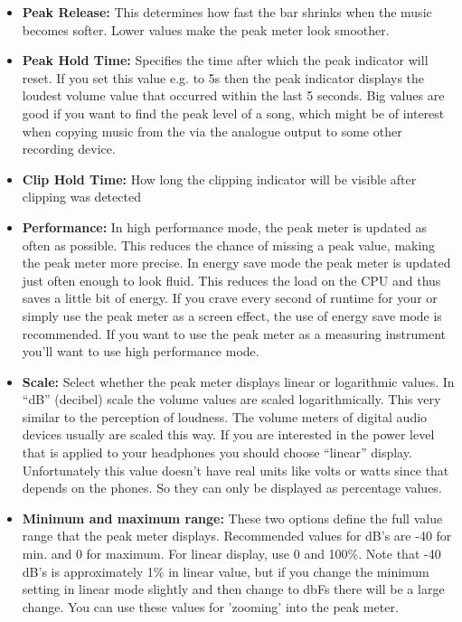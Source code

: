 \begin{itemize}
\begin{itemize}
{    \begin{itemize}
    \item \textbf{Peak Release:}
      This determines how fast the bar shrinks when the music becomes softer. Lower values make the peak meter look smoother.
    \item \textbf{Peak Hold Time:} 
      Specifies the time after which the peak indicator will reset. If you set this value e.g. to 5s then the peak indicator displays the loudest volume value that occurred within the last 5 seconds. Big values are good if you want to find the peak level of a song, which might be of interest when copying music from the \dap via the analogue output to some other recording device.
    \item \textbf{Clip Hold Time:}
      How long the clipping indicator will be visible after clipping was detected 
    \item \textbf{Performance:}
      In high performance mode, the peak meter is updated as often as possible. This reduces the chance of missing a peak value, making the peak meter more precise. In energy save mode the peak meter is updated just often enough to look fluid. This reduces the load on the CPU and thus saves a little bit of energy. If you crave every second of runtime for your \dap or simply use the peak meter as a screen effect, the use of energy save mode is recommended. If you want to use the peak meter as a measuring instrument you'll want to use high performance mode.
    \item \textbf{Scale:}
      Select whether the peak meter displays linear or logarithmic values. In ``dB'' (decibel) scale the volume values are scaled logarithmically. This very similar to the perception of loudness. The volume meters of digital audio devices usually are scaled this way. If you are interested in the power level that is applied to your headphones you should choose ``linear'' display. Unfortunately this value doesn't have real units like volts or watts since that depends on the phones. So they can only be displayed as percentage values.
    \item \textbf{Minimum and maximum range:} 
      These two options define the full value range that the peak meter displays. Recommended values for dB's are {}-40 for min. and 0 for maximum. For linear display, use 0 and 100\%. Note that {}-40 dB's is approximately 1\% in linear value, but if you change the minimum setting in linear mode slightly and then change to dbFs there will be a large change. You can use these values for 'zooming' into the peak meter.
    \end{itemize}
  }
\end{itemize}


\end{itemize}
